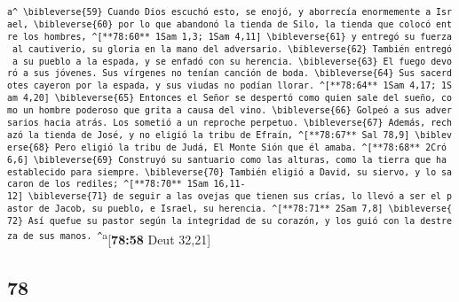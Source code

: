 \begin{paracol}{2}
\textsuperscript{\texttt{a\^{}\ \textbackslash{}bibleverse\{59\}\ Cuando\ Dios\ escuchó\ esto,\ se\ enojó,\ y\ aborrecía\ enormemente\ a\ Israel,\ \textbackslash{}bibleverse\{60\}\ por\ lo\ que\ abandonó\ la\ tienda\ de\ Silo,\ la\ tienda\ que\ colocó\ entre\ los\ hombres,\ \^{}{[}**78:60**\ 1Sam\ 1,3;\ 1Sam\ 4,11{]}\ \textbackslash{}bibleverse\{61\}\ y\ entregó\ su\ fuerza\ al\ cautiverio,\ su\ gloria\ en\ la\ mano\ del\ adversario.\ \textbackslash{}bibleverse\{62\}\ También\ entregó\ a\ su\ pueblo\ a\ la\ espada,\ y\ se\ enfadó\ con\ su\ herencia.\ \textbackslash{}bibleverse\{63\}\ El\ fuego\ devoró\ a\ sus\ jóvenes.\ Sus\ vírgenes\ no\ tenían\ canción\ de\ boda.\ \textbackslash{}bibleverse\{64\}\ Sus\ sacerdotes\ cayeron\ por\ la\ espada,\ y\ sus\ viudas\ no\ podían\ llorar.\ \^{}{[}**78:64**\ 1Sam\ 4,17;\ 1Sam\ 4,20{]}\ \textbackslash{}bibleverse\{65\}\ Entonces\ el\ Señor\ se\ despertó\ como\ quien\ sale\ del\ sueño,\ como\ un\ hombre\ poderoso\ que\ grita\ a\ causa\ del\ vino.\ \textbackslash{}bibleverse\{66\}\ Golpeó\ a\ sus\ adversarios\ hacia\ atrás.\ Los\ sometió\ a\ un\ reproche\ perpetuo.\ \textbackslash{}bibleverse\{67\}\ Además,\ rechazó\ la\ tienda\ de\ José,\ y\ no\ eligió\ la\ tribu\ de\ Efraín,\ \^{}{[}**78:67**\ Sal\ 78,9{]}\ \textbackslash{}bibleverse\{68\}\ Pero\ eligió\ la\ tribu\ de\ Judá,\ El\ Monte\ Sión\ que\ él\ amaba.\ \^{}{[}**78:68**\ 2Cró\ 6,6{]}\ \textbackslash{}bibleverse\{69\}\ Construyó\ su\ santuario\ como\ las\ alturas,\ como\ la\ tierra\ que\ ha\ establecido\ para\ siempre.\ \textbackslash{}bibleverse\{70\}\ También\ eligió\ a\ David,\ su\ siervo,\ y\ lo\ sacaron\ de\ los\ rediles;\ \^{}{[}**78:70**\ 1Sam\ 16,11-12{]}\ \textbackslash{}bibleverse\{71\}\ de\ seguir\ a\ las\ ovejas\ que\ tienen\ sus\ crías,\ lo\ llevó\ a\ ser\ el\ pastor\ de\ Jacob,\ su\ pueblo,\ e\ Israel,\ su\ herencia.\ \^{}{[}**78:71**\ 2Sam\ 7,8{]}\ \textbackslash{}bibleverse\{72\}\ Así\ quefue\ su\ pastor\ según\ la\ integridad\ de\ su\ corazón,\ y\ los\ guió\ con\ la\ destreza\ de\ sus\ manos.\ \^{}}a}{[}\textbf{78:58}
Deut 32,21{]} \switchcolumn \begin{otherlanguage}{english}

\hypertarget{section-155}{%
\section{78}\label{section-155}}


\end{otherlanguage}
\end{paracol}
